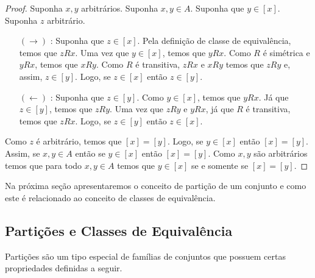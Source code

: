 \begin{proof}
Suponha $x,y$ arbitrários. Suponha $x,y \in A$. Suponha que $y \in
[x]$. Suponha $z$ arbitrário.
\begin{enumerate}
  \item[$(\to)$]: Suponha que $z \in [x]$. Pela definição de classe de
    equivalência, temos que $zRx$. Uma vez que $y \in [x]$, temos que
    $yRx$. Como $R$ é simétrica e $yRx$, temos que $xRy$. Como $R$ é
    transitiva, $zRx$ e $xRy$ temos que $zRy$ e, assim, $z\in
    [y]$. Logo, se $z\in [x]$ então $z \in [y]$.
  \item[$(\leftarrow)$]: Suponha que $z\in [y]$. Como $y \in [x]$,
    temos que $yRx$. Já que $z\in [y]$, temos que $zRy$. Uma vez que
    $zRy$ e $yRx$, já que $R$ é transitiva, temos que $zRx$. Logo, se
    $z \in [y]$ então $z \in [x]$.
\end{enumerate}
Como $z$ é arbitrário, temos que $[x] = [y]$. Logo, se $y \in [x]$
então $[x] = [y]$. Assim, se $x,y \in A$ então se $y \in [x]$ então
$[x] = [y]$. Como $x,y$ são arbitrários temos que para todo $x,y \in A$ temos que $y \in [x]$ se e somente se $[x] = [y]$.
\end{proof}

Na próxima seção apresentaremos o conceito de partição de um
conjunto e como este é relacionado ao conceito de classes de
equivalência.

\subsection{Partições e Classes de Equivalência}

Partições são um tipo especial de famílias de conjuntos que possuem
certas propriedades definidas a seguir.

